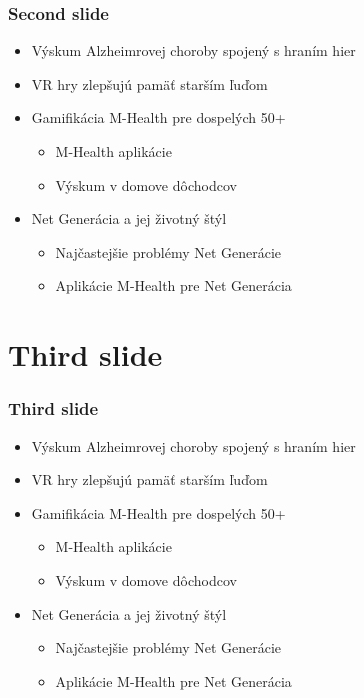 \documentclass{beamer}
\newcommand{\ssection}[1]{
	\section{#1}
	\begin{frame}[fragile=singleslide]\frametitle{}
	\Huge #1
	\end{frame}
}
\begin{document}
\begin{frame}[fragile=singleslide]\frametitle{Second slide}
\begin{itemize}
\item Výskum Alzheimrovej choroby spojený s hraním hier
\item VR hry zlepšujú pamäť starším ľuďom
\item Gamifikácia M-Health pre dospelých 50+
	\begin{itemize}
	\item M-Health aplikácie 
	\item Výskum v domove dôchodcov
	\end{itemize}
\item Net Generácia a jej životný štýl
	\begin{itemize}
	\item Najčastejšie problémy Net Generácie
	\item Aplikácie M-Health pre Net Generácia 
	\end{itemize}
\end{itemize}
\end{frame}


\section{Third slide}

\begin{frame}[fragile=singleslide]\frametitle{Third slide}
\begin{itemize}
\item Výskum Alzheimrovej choroby spojený s hraním hier
\item VR hry zlepšujú pamäť starším ľuďom
\item Gamifikácia M-Health pre dospelých 50+
	\begin{itemize}
	\item M-Health aplikácie 
	\item Výskum v domove dôchodcov
	\end{itemize}
\item Net Generácia a jej životný štýl
	\begin{itemize}
	\item Najčastejšie problémy Net Generácie
	\item Aplikácie M-Health pre Net Generácia 
	\end{itemize}
\end{itemize}
\end{frame}
\end{document}
